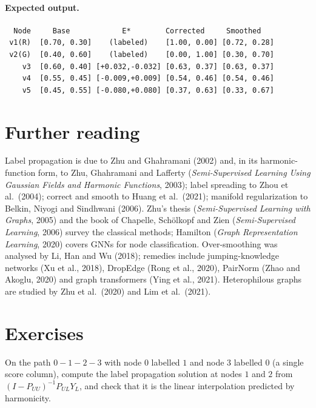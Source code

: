 \begin{notechapter}
\paragraph{Expected output.}
\begin{verbatim}
  Node     Base            E*        Corrected     Smoothed
 v1(R)  [0.70, 0.30]    (labeled)    [1.00, 0.00] [0.72, 0.28]
 v2(G)  [0.40, 0.60]    (labeled)    [0.00, 1.00] [0.30, 0.70]
    v3  [0.60, 0.40] [+0.032,-0.032] [0.63, 0.37] [0.63, 0.37]
    v4  [0.55, 0.45] [-0.009,+0.009] [0.54, 0.46] [0.54, 0.46]
    v5  [0.45, 0.55] [-0.080,+0.080] [0.37, 0.63] [0.33, 0.67]
\end{verbatim}

\section*{Further reading}
Label propagation is due to Zhu and Ghahramani (2002) and, in its harmonic-function form, to Zhu, Ghahramani and Lafferty (\emph{Semi-Supervised Learning Using Gaussian Fields and Harmonic Functions}, 2003); label spreading to Zhou et al.\ (2004); correct and smooth to Huang et al.\ (2021); manifold regularization to Belkin, Niyogi and Sindhwani (2006). Zhu's thesis (\emph{Semi-Supervised Learning with Graphs}, 2005) and the book of Chapelle, Schölkopf and Zien (\emph{Semi-Supervised Learning}, 2006) survey the classical methods; Hamilton (\emph{Graph Representation Learning}, 2020) covers GNNs for node classification. Over-smoothing was analysed by Li, Han and Wu (2018); remedies include jumping-knowledge networks (Xu et al., 2018), DropEdge (Rong et al., 2020), PairNorm (Zhao and Akoglu, 2020) and graph transformers (Ying et al., 2021). Heterophilous graphs are studied by Zhu et al.\ (2020) and Lim et al.\ (2021).

\section*{Exercises}

\begin{exercise}\label{semi-supervised-graphs:exr:1}
On the path $0 - 1 - 2 - 3$ with node $0$ labelled $1$ and node $3$ labelled $0$ (a single score column), compute the label propagation solution at nodes $1$ and $2$ from $(I - P_{UU})^{-1}P_{UL}Y_L$, and check that it is the linear interpolation predicted by harmonicity.
\end{exercise}


\end{notechapter}
